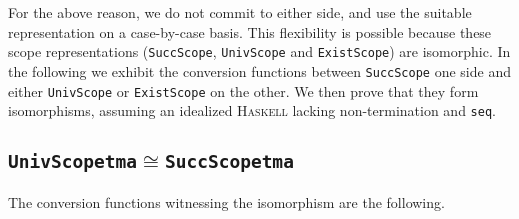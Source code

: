 \documentclass[9pt,authoryear]{sigplanconf}
\begin{document}
%
For the above reason, we do not commit to either side, and use the
    suitable representation on a case-by-case basis. This flexibility
    is possible because these scope representations (\texttt{SuccScope},
    \texttt{UnivScope} and \texttt{ExistScope}) are isomorphic. In the following
    we exhibit the conversion functions between \texttt{SuccScope} one side
    and either \texttt{UnivScope} or \texttt{ExistScope} on the other. We then
    prove that they form isomorphisms, assuming an idealized \textsc{Haskell}    lacking non-termination and \texttt{seq}.%


\subsection{\texttt{UnivScope}\texttt{\mbox{\hspace{0.50em}}}\texttt{tm}\texttt{\mbox{\hspace{0.50em}}}\texttt{a}\texttt{\mbox{\hspace{0.50em}}}\texttt{\ensuremath{\cong}}\texttt{\mbox{\hspace{0.50em}}}\texttt{SuccScope}\texttt{\mbox{\hspace{0.50em}}}\texttt{tm}\texttt{\mbox{\hspace{0.50em}}}\texttt{a}}

%
The conversion functions witnessing the isomorphism are the
    following.%


\newpage
\end{document}

